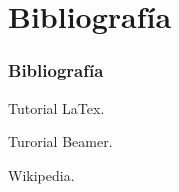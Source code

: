 \documentclass{beamer}
\begin{document}

\section{Bibliografía}
\begin{frame}
  \frametitle{Bibliografía}

  \begin{thebibliography}{10}

    \beamertemplatebookbibitems
    Tutorial LaTex. 

    \beamertemplatebookbibitems
    Turorial Beamer. 

    \beamertemplatebookbibitems
    Wikipedia. %

  \end{thebibliography}
\end{frame}

\end{document}
